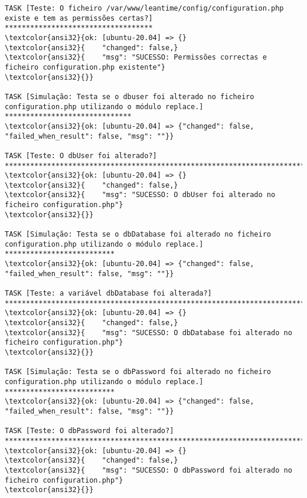 \documentclass{scrartcl}
\begin{document}
\begin{Verbatim}
TASK [Teste: O ficheiro /var/www/leantime/config/configuration.php existe e tem as permissões certas?] ***********************************
\textcolor{ansi32}{ok: [ubuntu-20.04] => {}
\textcolor{ansi32}{    "changed": false,}
\textcolor{ansi32}{    "msg": "SUCESSO: Permissões correctas e ficheiro configuration.php existente"}
\textcolor{ansi32}{}}

TASK [Simulação: Testa se o dbuser foi alterado no ficheiro configuration.php utilizando o módulo replace.] ******************************
\textcolor{ansi32}{ok: [ubuntu-20.04] => {"changed": false, "failed_when_result": false, "msg": ""}}

TASK [Teste: O dbUser foi alterado?] *****************************************************************************************************
\textcolor{ansi32}{ok: [ubuntu-20.04] => {}
\textcolor{ansi32}{    "changed": false,}
\textcolor{ansi32}{    "msg": "SUCESSO: O dbUser foi alterado no ficheiro configuration.php"}
\textcolor{ansi32}{}}

TASK [Simulação: Testa se o dbDatabase foi alterado no ficheiro configuration.php utilizando o módulo replace.] **************************
\textcolor{ansi32}{ok: [ubuntu-20.04] => {"changed": false, "failed_when_result": false, "msg": ""}}

TASK [Teste: a variável dbDatabase foi alterada?] ****************************************************************************************
\textcolor{ansi32}{ok: [ubuntu-20.04] => {}
\textcolor{ansi32}{    "changed": false,}
\textcolor{ansi32}{    "msg": "SUCESSO: O dbDatabase foi alterado no ficheiro configuration.php"}
\textcolor{ansi32}{}}

TASK [Simulação: Testa se o dbPassword foi alterado no ficheiro configuration.php utilizando o módulo replace.] **************************
\textcolor{ansi32}{ok: [ubuntu-20.04] => {"changed": false, "failed_when_result": false, "msg": ""}}

TASK [Teste: O dbPassword foi alterado?] *************************************************************************************************
\textcolor{ansi32}{ok: [ubuntu-20.04] => {}
\textcolor{ansi32}{    "changed": false,}
\textcolor{ansi32}{    "msg": "SUCESSO: O dbPassword foi alterado no ficheiro configuration.php"}
\textcolor{ansi32}{}}


\end{Verbatim}
\end{document}
